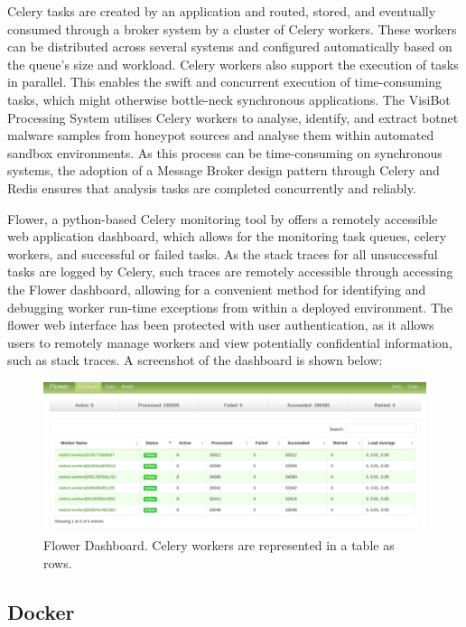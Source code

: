 Celery tasks are created by an application and routed, stored, and eventually consumed through a broker system by a cluster of Celery workers. These workers can be distributed across several systems and configured automatically based on the queue's size and workload. Celery workers also support the execution of tasks in parallel. This enables the swift and concurrent execution of time-consuming tasks, which might otherwise bottle-neck synchronous applications. The VisiBot Processing System utilises Celery workers to analyse, identify, and extract botnet malware samples from honeypot sources and analyse them within automated sandbox environments. As this process can be time-consuming on synchronous systems, the adoption of a Message Broker design pattern through Celery and Redis ensures that analysis tasks are completed concurrently and reliably.

Flower, a python-based Celery monitoring tool by \citet{CeleryFlower} offers a remotely accessible web application dashboard, which allows for the monitoring task queues, celery workers, and successful or failed tasks. As the stack traces for all unsuccessful tasks are logged by Celery, such traces are remotely accessible through accessing the Flower dashboard, allowing for a convenient method for identifying and debugging worker run-time exceptions from within a deployed environment. The flower web interface has been protected with user authentication, as it allows users to remotely manage workers and view potentially confidential information, such as stack traces. A screenshot of the dashboard is shown below:

\begin{figure}
    \centering
    \includegraphics[width=1.0\linewidth]{images/flower-panel.png}
    \caption{Flower Dashboard. Celery workers are represented in a table as rows.}
    \label{fig:flower_dashboard} 
\end{figure}

\subsection{Docker}

